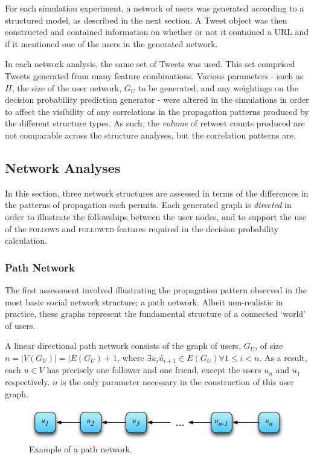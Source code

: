 For each simulation experiment, a network of users was generated according to a structured model, as described in the next section. A Tweet object was then constructed and contained information on whether or not it contained a URL and if it mentioned one of the users in the generated network. 

In each network analysis, the same set of Tweets was used. This set comprised Tweets generated from many feature combinations. Various parameters - such as $H$, the size of the user network, $G_U$ to be generated, and any weightings on the decision probability prediction generator - were altered in the simulations in order to affect the visibility of any correlations in the propagation patterns produced by the different structure types. As such, the \textit{volume} of retweet counts produced are not comparable across the structure analyses, but the correlation patterns are.


\subsection{Network Analyses}
In this section, three network structures are assessed in terms of the differences in the patterns of propagation each permits. Each generated graph is \textit{directed} in order to illustrate the followships between the user nodes, and to support the use of the \textsc{follows} and \textsc{followed} features required in the decision probability calculation.


\subsubsection{Path Network}
The first assessment involved illustrating the propagation pattern observed in the most basic social network structure; a path network. Albeit non-realistic in practice, these graphs represent the fundamental structure of a connected `world' of users.

A linear directional path network consists of the graph of users, $G_U$, of size $n = |V(G_U)| = |E(G_U) + 1$, where $\exists \overleftarrow{u_i u_{i+1}} \in E(G_U) \forall 1 \leq i < n$. As a result, each $u \in V$ has precisely one follower and one friend, except the users $u_n$ and $u_1$ respectively. $n$ is the only parameter necessary in the construction of this user graph.

\begin{figure}[h]
\centering
\includegraphics[scale=0.8]{4.Chapter2/Media/path_network.png} 
\caption{Example of a path network.}
\label{fig:path_network}
\end{figure}

